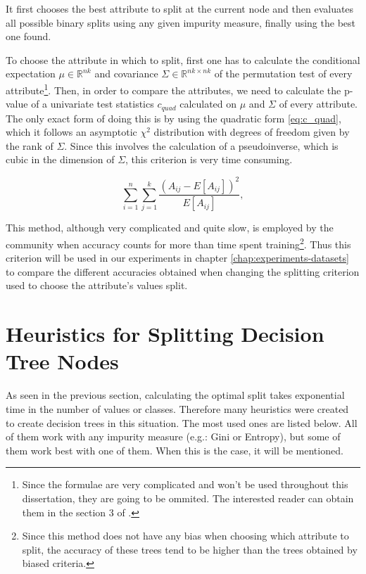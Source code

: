 It first chooses the best attribute to split at the current node and then evaluates all possible binary splits using any given impurity measure, finally using the best one found.

To choose the attribute in which to split, first one has to calculate the conditional expectation $\mu \in \mathbb{R}^{nk}$ and covariance $\Sigma \in \mathbb{R}^{nk\times nk}$ of the permutation test of every attribute\footnote{Since the formulae are very complicated and won't be used throughout this dissertation, they are going to be ommited. The interested reader can obtain them in the section 3 of  \cite{Hothorn:2006:URP}.}. Then, in order to compare the attributes, we need to calculate the p-value of a univariate test statistics $c_{quad}$ calculated on $\mu$ and $\Sigma$ of every attribute. The only exact form of doing this is by using the quadratic form \ref{eq:c_quad}, which it follows an asymptotic $\chi^2$ distribution with degrees of freedom given by the rank of $\Sigma$. Since this involves the calculation of a pseudoinverse, which is cubic in the dimension of $\Sigma$, this criterion is very time consuming.

\begin{equation}
\label{eq:c_quad}
\sum_{i=1}^n \sum_{j=1}^k \frac{(A_{ij}-E[A_{ij}] )^2}{E[A_{ij}]},
\end{equation}

This method, although very complicated and quite slow, is employed by the community when accuracy counts for more than time spent training\footnote{Since this method does not have any bias when choosing which attribute to split, the accuracy of these trees tend to be higher than the trees obtained by biased criteria.}. Thus this criterion will be used in our experiments in chapter \ref{chap:experiments-datasets} to compare the different accuracies obtained when changing the splitting criterion used to choose the attribute's values split.

\section{Heuristics for Splitting Decision Tree Nodes}
As seen in the previous section, calculating the optimal split takes exponential time in the number of values or classes. Therefore many heuristics were created to create decision trees in this situation. The most used ones are listed below. All of them work with any impurity measure (e.g.: Gini or Entropy), but some of them work best with one of them. When this is the case, it will be mentioned.

